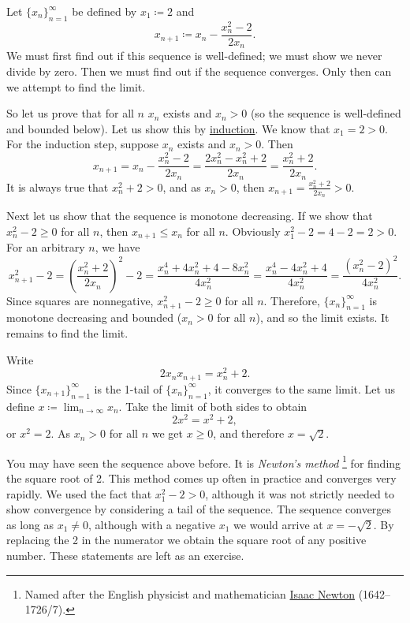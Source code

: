 \begin{example}
Let $\{ x_n \}_{n=1}^\infty$ be defined by $x_1 \coloneqq 2$ and
\begin{equation*}
x_{n+1} \coloneqq x_n - \frac{x_n^2-2}{2x_n} .
\end{equation*}
We must first find out if this sequence is well-defined; we must show we never
divide by zero.
Then we must find out if the sequence converges.  Only then
can we attempt to find the limit.

So let us prove that for all $n$ 
$x_n$ exists and $x_n > 0$
(so the sequence is well-defined and bounded below).
Let us show this by \hyperref[induction:thm]{induction}.  We know that
$x_1 = 2 > 0$.  For the induction step, suppose $x_n$ exists and
$x_n > 0$.  Then
\begin{equation*}
x_{n+1} = x_n - \frac{x_n^2-2}{2x_n} =
\frac{2x_n^2 - x_n^2+2}{2x_n} =
\frac{x_n^2+2}{2x_n} .
\end{equation*}
It is always true that $x_n^2+2 > 0$,
and as
$x_n > 0$, then $x_{n+1} = \frac{x_n^2+2}{2x_n} > 0$.

Next let us
show that the sequence is monotone decreasing.  If we show that
$x_n^2-2 \geq 0$ for all $n$, then $x_{n+1} \leq x_n$ for all $n$.
Obviously $x_1^2-2 = 4-2 = 2 > 0$.  For an arbitrary $n$, we have 
\begin{equation*}
x_{n+1}^2-2 =
{\left( \frac{x_n^2+2}{2x_n} \right)}^2 - 2
=
\frac{x_n^4+4x_n^2+4 - 8x_n^2}{4x_n^2}
=
\frac{x_n^4-4x_n^2+4}{4x_n^2}
=
\frac{{\left( x_n^2-2 \right)}^2}{4x_n^2} .
\end{equation*}
Since squares are nonnegative,
$x_{n+1}^2-2 \geq 0$ for all $n$.  Therefore,
$\{ x_n \}_{n=1}^\infty$ is monotone decreasing and bounded ($x_n > 0$ for all $n$), and 
so the limit exists.  It remains to find the limit.

Write
\begin{equation*}
2x_nx_{n+1} = x_n^2+2 .
\end{equation*}
Since $\{ x_{n+1} \}_{n=1}^\infty$ is the 1-tail of $\{ x_n \}_{n=1}^\infty$, it converges to the
same limit.  Let us define $x \coloneqq \lim_{n\to\infty} x_n$.  Take the limit of
both sides to obtain
\begin{equation*}
2x^2 = x^2+2 ,
\end{equation*}
or $x^2 = 2$.  As $x_n > 0$ for all $n$ we get $x \geq 0$, and therefore $x = \sqrt{2}$.
\end{example}

You may have seen the sequence above before.  It is
\emph{Newton's method}%
\footnote{%
Named after the English physicist and mathematician
\href{https://en.wikipedia.org/wiki/Isaac_Newton}{Isaac Newton}
(1642--1726/7).}
for finding the square root of 2.  This method comes up often in
practice and converges very rapidly.  We used the fact that
$x_1^2 -2 >0$, although it was not strictly needed to show convergence by
considering a tail of the sequence.
The sequence converges as long as $x_1 \not= 0$, although with a negative $x_1$
we would arrive at $x=-\sqrt{2}$.  By replacing the 2 in the numerator we 
obtain the square root of any positive number.  These statements are left as
an exercise.

